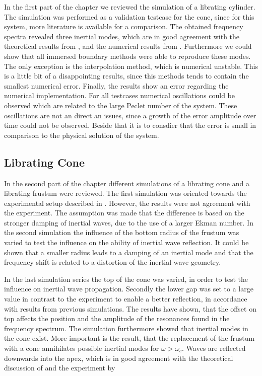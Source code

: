 In the first part of the chapter we reviewed the simulation of a librating cylinder.
The simulation was performed as a validation testcase for the cone,
since for this system, more literature is available for a comparison.
The obtained frequency spectra revealed three inertial modes,
which are in good agreement with the theoretical results from \citep{Greenspan1990},  and the  numerical results from \citep{Sauret2012}.
Furthermore we could show that all immersed boundary methods were able to reproduce these modes.
The only exception is the interpolation method, which is numerical unstable.
This is a little bit of a disappointing results, since this methods tends to contain
the smallest numerical error.
Finally, the results show an error regarding the numerical implementation.
For all testcases numerical oscillations could be observed which are related to the
large Peclet number of the system.
These oscillations are not an direct an issues, since a growth of the error amplitude over time could not be observed.
Beside that it is to consdier that the error is small in comparison to the physical solution of the system.

\subsection{Librating Cone}

In the second part of the chapter different simulations of
a librating cone and a librating frustum were reviewed.
The first simulation was oriented towards the experimental setup described in \citep{Beardsley1970}.
However, the results  were not agreement with the experiment.
The assumption was made that the difference is based on the  stronger damping of inertial waves,
due to the use of a larger Ekman number.
In the second simulation the influence of the bottom radius of the frustum was varied
to test the influence on the ability of inertial wave reflection.
It could be shown that a smaller radius leads to a damping of an inertial mode and that the frequency
shift is related to a distortion of the inertial wave geometry.

In the last simulation series  the top of the cone was varied, in order to test the influence on
inertial wave propagation. Secondly the lower gap was set to a large value in contrast to the experiment
to enable a better reflection, in accordance with results from previous simulations.
The results have shown, that the offset on top affects the position and the amplitude of the resonances
found in the frequency spectrum.
The simulation furthermore showed that inertial modes in the cone exist.
More important is the result, that the replacement of the frustum with a cone annihilates possible
inertial modes for $\omega > \omega_c$.
Waves are reflected downwards into the apex, which is in good agreement with the
theoretical discussion of \citep{Greenspan1969} and the experiment by \citep{Beardsley1970}

